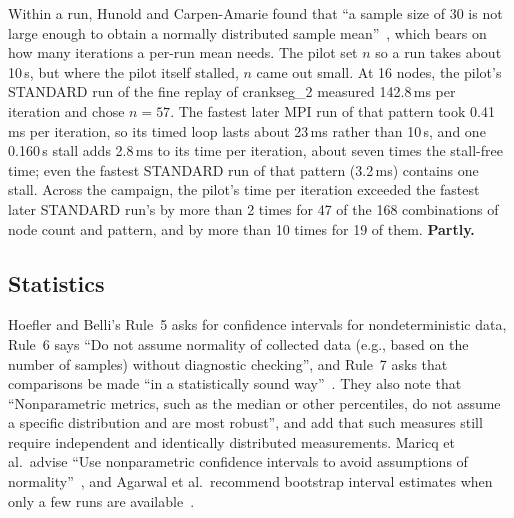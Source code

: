 \documentclass[11pt]{article}
\newcommand{\verdict}[1]{\textbf{#1}}
\begin{document}
Within a run, Hunold and Carpen-Amarie found that ``a sample size of 30 is not large
enough to obtain a normally distributed sample mean''~\cite[Section~4.1]{hunold2016reproducible},
which bears on how many iterations a per-run mean needs. The pilot set $n$ so a run takes
about 10\,s, but where the pilot itself stalled, $n$ came out small. At 16 nodes, the
pilot's STANDARD run of the fine replay of crankseg\_2 measured 142.8\,ms per iteration
and chose $n=57$. The fastest later MPI run of that pattern took 0.41\,ms per iteration,
so its timed loop lasts about 23\,ms rather than 10\,s, and one 0.160\,s stall adds
2.8\,ms to its time per iteration, about seven times the stall-free time; even the
fastest STANDARD run of that pattern (3.2\,ms) contains one stall. Across the campaign,
the pilot's time per iteration exceeded the fastest later STANDARD run's by more than 2
times for 47 of the 168 combinations of node count and pattern, and by more than 10 times
for 19 of them. \verdict{Partly.}

\subsection{Statistics}

Hoefler and Belli's Rule~5 asks for confidence intervals for nondeterministic data, Rule~6
says ``Do not assume normality of collected data (e.g., based on the number of samples)
without diagnostic checking'', and Rule~7 asks that comparisons be made ``in a
statistically sound way''~\cite{hoefler2015scientific}. They also note that
``Nonparametric metrics, such as the median or other percentiles, do not assume a specific
distribution and are most robust'', and add that such measures still require independent
and identically distributed measurements. Maricq et al.\ advise ``Use nonparametric
confidence intervals to avoid assumptions of normality''~\cite{maricq2018taming}, and
Agarwal et al.\ recommend bootstrap interval estimates when only a few runs are
available~\cite{agarwal2021deep}.
\end{document}

